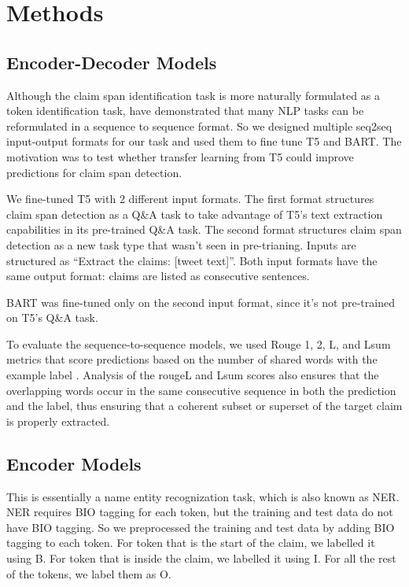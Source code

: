 \documentclass[11pt]{article}
\begin{document}
\section{Methods}
\subsection{Encoder-Decoder Models}
Although the claim span identification task is more naturally formulated as a token identification task, \cite{T5-paper} have demonstrated that many NLP tasks can be reformulated in a sequence to sequence format. So we designed multiple seq2seq input-output formats for our task and used them to fine tune T5 and BART. The motivation was to test whether transfer learning from T5 could improve predictions for claim span detection.

We fine-tuned T5 with 2 different input formats. The first format structures claim span detection as a Q\&A task to take advantage of T5’s text extraction capabilities in its pre-trained Q\&A task. The second format structures claim span detection as a new task type that wasn’t seen in pre-trianing. Inputs are structured as “Extract the claims: [tweet text]”. Both input formats have the same output format: claims are listed as consecutive sentences.

BART was fine-tuned only on the second input format, since it’s not pre-trained on T5’s Q\&A task.

To evaluate the sequence-to-sequence models, we used Rouge 1, 2, L, and Lsum metrics that score predictions based on the number of shared words with the example label \cite{rouge}. Analysis of the rougeL and Lsum scores also ensures that the overlapping words occur in the same consecutive sequence in both the prediction and the label, thus ensuring that a coherent subset or superset of the target claim is properly extracted.

\subsection{Encoder Models}
This is essentially a name entity recognization task, which is also known as NER. NER requires BIO tagging for each token, but the training and test data do not have BIO tagging. So we preprocessed the training and test data by adding BIO tagging to each token. For token that is  the start of the claim, we labelled it using B. For token that is inside the claim, we labelled it using I. For all the rest of the tokens, we label them as O.
\end{document}
